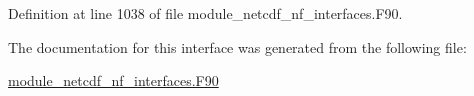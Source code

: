 Definition at line 1038 of file module\+\_\+netcdf\+\_\+nf\+\_\+interfaces.\+F90.



The documentation for this interface was generated from the following file\+:\begin{DoxyCompactItemize}
\item 
\hyperlink{module__netcdf__nf__interfaces_8F90}{module\+\_\+netcdf\+\_\+nf\+\_\+interfaces.\+F90}\end{DoxyCompactItemize}

